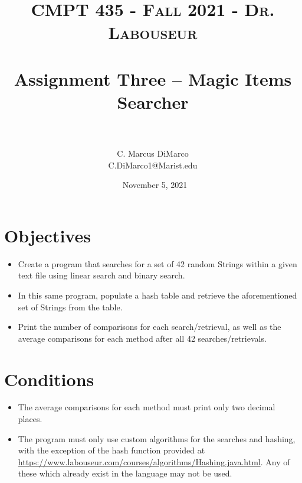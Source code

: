 \documentclass[letterpaper, 10pt]{article}
\title{	
   \normalfont \normalsize 
   \textsc{CMPT 435 - Fall 2021 - Dr. Labouseur} \\[10pt] %
   \horrule{0.5pt} \\[0.25cm] 	%
   \huge Assignment Three -- Magic Items Searcher \\     	    %
   \horrule{0.5pt} \\[0.25cm] 	%
}
\author{C. Marcus DiMarco \\ \normalsize C.DiMarco1@Marist.edu}
\date{\normalsize\ November 5, 2021} 	%
\begin{document}
\maketitle %



\section{Objectives}

\begin{itemize}
    \item \hspace{0.5em}Create a program that searches for a set of 42 random Strings within a given text file using linear search and binary search.
    \item \hspace{0.5em}In this same program, populate a hash table and retrieve the aforementioned set of Strings from the table.
    \item \hspace{0.5em}Print the number of comparisons for each search/retrieval, as well as the average comparisons for each method after all 42 searches/retrievals.
\end{itemize}

\vspace{1.0em}

\section{Conditions}

\begin{itemize}
    \item \hspace{0.5em}The average comparisons for each method must print only two decimal places.
    \item \hspace{0.5em}The program must only use custom algorithms for the searches and hashing, with the exception of the hash function provided at  \url{https://www.labouseur.com/courses/algorithms/Hashing.java.html}. Any of these which already exist in the language may not be used.
\end{itemize}
\end{document}
